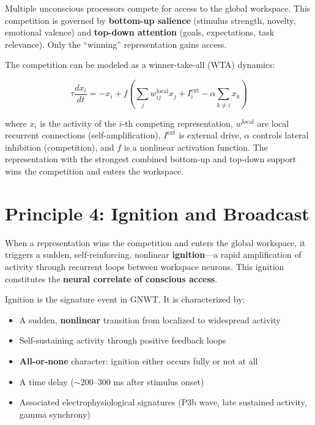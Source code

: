 \documentclass[11pt,a4paper]{report}
\begin{document}
\begin{principlebox}
Multiple unconscious processors compete for access to the global workspace. This competition is governed by \textbf{bottom-up salience} (stimulus strength, novelty, emotional valence) and \textbf{top-down attention} (goals, expectations, task relevance). Only the ``winning'' representation gains access.
\end{principlebox}

The competition can be modeled as a winner-take-all (WTA) dynamics:

\begin{mathbox}
\vspace{-6pt}
\[
  \tau \frac{dx_i}{dt} = -x_i + f\!\left(\sum_j w_{ij}^{\text{local}} x_j + I_i^{\text{ext}} - \alpha \sum_{k \neq i} x_k\right)
\]
\vspace{-8pt}
\end{mathbox}

where $x_i$ is the activity of the $i$-th competing representation, $w^{\text{local}}$ are local recurrent connections (self-amplification), $I^{\text{ext}}$ is external drive, $\alpha$ controls lateral inhibition (competition), and $f$ is a nonlinear activation function. The representation with the strongest combined bottom-up and top-down support wins the competition and enters the workspace.

\section{Principle 4: Ignition and Broadcast}

\begin{principlebox}
When a representation wins the competition and enters the global workspace, it triggers a sudden, self-reinforcing, nonlinear \textbf{ignition}---a rapid amplification of activity through recurrent loops between workspace neurons. This ignition constitutes the \textbf{neural correlate of conscious access}.
\end{principlebox}

Ignition is the signature event in GNWT. It is characterized by:
\begin{itemize}[leftmargin=1.5em]
  \item A sudden, \textbf{nonlinear} transition from localized to widespread activity
  \item Self-sustaining activity through positive feedback loops
  \item \textbf{All-or-none} character: ignition either occurs fully or not at all
  \item A time delay ($\sim$200--300 ms after stimulus onset)
  \item Associated electrophysiological signatures (P3b wave, late sustained activity, gamma synchrony)
\end{itemize}
\end{document}

